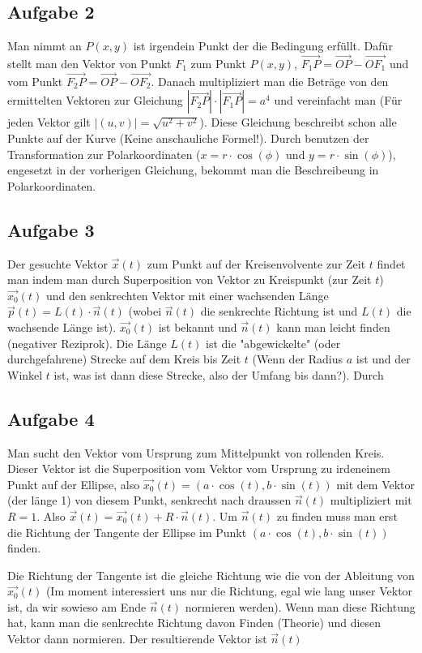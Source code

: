 \documentclass[11pt]{article} %
\begin{document}
\subsection{Aufgabe 2}
Man nimmt an $P(x,y)$ ist irgendein Punkt der die Bedingung erfüllt. Dafür stellt man den Vektor von Punkt $F_1$ zum Punkt $P(x,y)$, $\overrightarrow{F_1P}=\overrightarrow{OP} - \overrightarrow{OF_1}$ und vom Punkt $\overrightarrow{F_2P}=\overrightarrow{OP} - \overrightarrow{OF_2}$. Danach multipliziert man die Beträge von den ermittelten Vektoren zur Gleichung $|\overrightarrow{F_2P}|\cdot |\overrightarrow{F_1P}|=a^4$ und vereinfacht man (Für jeden Vektor gilt $|(u,v)|=\sqrt{u^2 + v^2}$). Diese Gleichung beschreibt schon alle Punkte auf der Kurve (Keine anschauliche Formel!). Durch benutzen der Transformation zur Polarkoordinaten ($x=r\cdot\cos(\phi)$ und $y = r\cdot\sin(\phi)$), engesetzt in der vorherigen Gleichung, bekommt man die Beschreibeung in Polarkoordinaten. 

\subsection{Aufgabe 3}
Der gesuchte Vektor $\vec x(t)$ zum Punkt auf der Kreisenvolvente zur Zeit $t$ findet man indem man durch Superposition von Vektor zu Kreispunkt (zur Zeit $t$) $\vec {x_0}(t)$ und den senkrechten Vektor mit einer wachsenden Länge $\vec p(t) = L(t)\cdot\vec n(t)$ (wobei $\vec n(t)$ die senkrechte Richtung ist und $L(t)$ die wachsende Länge ist). $\vec{x_0}(t)$ ist bekannt und $\vec n(t)$ kann man leicht finden (negativer Reziprok). Die Länge $L(t)$ ist die "abgewickelte" (oder durchgefahrene) Strecke auf dem Kreis bis Zeit $t$ (Wenn der Radius $a$ ist und der Winkel $t$ ist, was ist dann diese Strecke, also der Umfang bis dann?). Durch 
 
\subsection{Aufgabe 4}
Man sucht den Vektor vom Ursprung zum Mittelpunkt von rollenden Kreis. Dieser Vektor ist die Superposition vom Vektor vom Ursprung zu irdeneinem Punkt auf der Ellipse, also $\vec{x_0}(t) = (a\cdot \cos(t), b\cdot \sin (t) )$ mit dem Vektor (der länge 1) von diesem Punkt, senkrecht nach draussen $\vec n (t)$ multipliziert mit $R=1$. Also $\vec{x}(t)=\vec {x_0}(t) + R\cdot\vec n (t)$. Um $\vec n (t)$ zu finden muss man erst die Richtung der Tangente der Ellipse im Punkt $(a\cdot \cos(t), b\cdot \sin(t))$ finden. 

Die Richtung der Tangente ist die gleiche Richtung wie die von der Ableitung von $\vec {x_0}(t)$ (Im moment interessiert uns nur die Richtung, egal wie lang unser Vektor ist, da wir sowieso am Ende $\vec n(t)$ normieren werden). Wenn man diese Richtung hat, kann man die senkrechte Richtung davon Finden (Theorie) und diesen Vektor dann normieren. Der resultierende Vektor ist $\vec n (t)$
\end{document}
